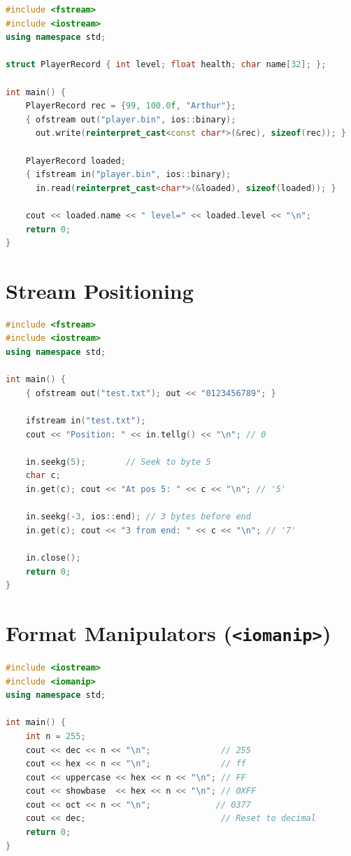\begin{lstlisting}[language=C++, caption={Struct serialisation to binary file}]
#include <fstream>
#include <iostream>
using namespace std;

struct PlayerRecord { int level; float health; char name[32]; };

int main() {
    PlayerRecord rec = {99, 100.0f, "Arthur"};
    { ofstream out("player.bin", ios::binary);
      out.write(reinterpret_cast<const char*>(&rec), sizeof(rec)); }

    PlayerRecord loaded;
    { ifstream in("player.bin", ios::binary);
      in.read(reinterpret_cast<char*>(&loaded), sizeof(loaded)); }

    cout << loaded.name << " level=" << loaded.level << "\n";
    return 0;
}
\end{lstlisting}

\section{Stream Positioning}
\label{sec:stream-positioning}

\begin{lstlisting}[language=C++, caption={seekg, tellg, seekg with direction}]
#include <fstream>
#include <iostream>
using namespace std;

int main() {
    { ofstream out("test.txt"); out << "0123456789"; }

    ifstream in("test.txt");
    cout << "Position: " << in.tellg() << "\n"; // 0

    in.seekg(5);        // Seek to byte 5
    char c;
    in.get(c); cout << "At pos 5: " << c << "\n"; // '5'

    in.seekg(-3, ios::end); // 3 bytes before end
    in.get(c); cout << "3 from end: " << c << "\n"; // '7'

    in.close();
    return 0;
}
\end{lstlisting}

\section{Format Manipulators (\texttt{<iomanip>})}
\label{sec:manipulators}

\begin{lstlisting}[language=C++, caption={Integer base and prefix}]
#include <iostream>
#include <iomanip>
using namespace std;

int main() {
    int n = 255;
    cout << dec << n << "\n";              // 255
    cout << hex << n << "\n";              // ff
    cout << uppercase << hex << n << "\n"; // FF
    cout << showbase  << hex << n << "\n"; // 0XFF
    cout << oct << n << "\n";             // 0377
    cout << dec;                           // Reset to decimal
    return 0;
}
\end{lstlisting}

